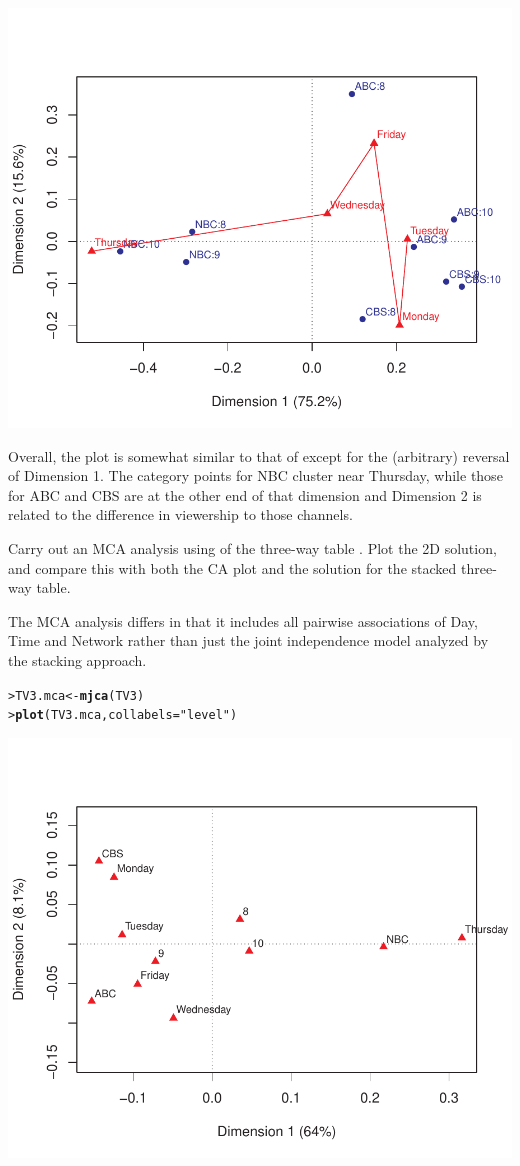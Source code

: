 \documentclass[10pt]{report}\usepackage[]{graphicx}\usepackage[]{color}
\makeatletter
\newcommand{\hlstr}[1]{\textcolor[rgb]{0.192,0.494,0.8}{#1}}%
\newcommand{\hlstd}[1]{\textcolor[rgb]{0.345,0.345,0.345}{#1}}%
\newcommand{\hlkwb}[1]{\textcolor[rgb]{0.69,0.353,0.396}{#1}}%
\newcommand{\hlkwc}[1]{\textcolor[rgb]{0.333,0.667,0.333}{#1}}%
\newcommand{\hlkwd}[1]{\textcolor[rgb]{0.737,0.353,0.396}{\textbf{#1}}}%
\newenvironment{kframe}{%
 \def\at@end@of@kframe{}%
 \ifinner\ifhmode%
  \def\at@end@of@kframe{\end{minipage}}%
  \begin{minipage}{\columnwidth}%
 \fi\fi%
 \def\FrameCommand##1{\hskip\@totalleftmargin \hskip-\fboxsep
 \colorbox{shadecolor}{##1}\hskip-\fboxsep
     \hskip-\linewidth \hskip-\@totalleftmargin \hskip\columnwidth}%
 \MakeFramed {\advance\hsize-\width
   \@totalleftmargin\z@ \linewidth\hsize
   \@setminipage}}%
 {\par\unskip\endMakeFramed%
 \at@end@of@kframe}
\newenvironment{knitrout}{}{} %
\renewenvironment{knitrout}{\small\renewcommand{\baselinestretch}{.85}}{} %
\makeatother
\begin{document}
\begin{Exercises}
\begin{enumerate*}
\begin{ans}
\begin{knitrout}
\centerline{\includegraphics[width=.5\textwidth]{soln/fig/ex6_9b-1} }



\end{knitrout}
    Overall, the plot is somewhat similar to that of  except for the (arbitrary) reversal
    of Dimension 1. The category points for NBC cluster near Thursday, while those for ABC and CBS
    are at the other end of that dimension and Dimension 2 is related to the difference in viewership
    to those channels.
    \end{ans}
    
    \item Carry out an MCA analysis using  of the three-way table .  Plot the 2D solution,
    and compare this with both the CA plot and the solution for the stacked three-way table.
    \begin{ans}
    The MCA analysis differs in that it includes all pairwise associations of Day, Time and Network
    rather than just the joint independence model analyzed by the stacking approach.
\begin{knitrout}\footnotesize
{}\color{fgcolor}\begin{kframe}
\begin{alltt}
\hlstd{> }\hlstd{TV3.mca} \hlkwb{<-} \hlkwd{mjca}\hlstd{(TV3)}
\hlstd{> }\hlkwd{plot}\hlstd{(TV3.mca,} \hlkwc{collabels}\hlstd{=}\hlstr{"level"}\hlstd{)}
\end{alltt}
\end{kframe}

\centerline{\includegraphics[width=.5\textwidth]{soln/fig/ex6_9c-1} }




\end{knitrout}
\end{ans}
\end{enumerate*}
\end{Exercises}
\end{document}
